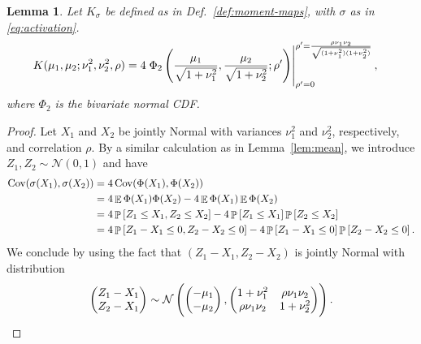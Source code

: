 \documentclass[oneside, article]{memoir}
\newtheorem{lemma}{Lemma}
\DeclareMathOperator{\expect}{\mathbb{E}}
\DeclareMathOperator{\probability}{\mathbb{P}}
\DeclareMathOperator{\Cov}{\operatorname{Cov}}
\begin{document}
\begin{lemma}
  Let \(K_\sigma\) be defined as in Def.~\ref{def:moment-maps}, with
  \(\sigma\) as in \eqref{eq:activation}.
  \begin{align*}
    K(\mu_1, \mu_2; \nu_1^2, \nu_2^2, \rho) &=
    4 \left.
    \Phi_2\del{
      \frac{\mu_1}{\sqrt{1 + \nu_1^2}},
      \frac{\mu_2}{\sqrt{1 + \nu_2^2}};
      \rho'
    }
    \right|^{\rho' = \frac{\rho \nu_1 \nu_2}{\sqrt{(1 +
    \nu_1^2)(1 + \nu_2^2)}}}_{\rho' = 0},
  \end{align*}
  where \(\Phi_2\) is the bivariate normal CDF.
\end{lemma}
\begin{proof}
  Let \(X_1\) and \(X_2\) be jointly Normal with variances
  \(\nu_1^2\) and \(\nu_2^2\), respectively, and correlation \(\rho\).
  By a similar calculation as in Lemma~\ref{lem:mean}, we introduce
  \(Z_1, Z_2 \sim \mathcal N(0, 1)\) and have
  \begin{align}
    \Cov (\sigma(X_1), \sigma(X_2))
    &= 4 \Cov (\Phi(X_1), \Phi(X_2))
    \\
    &= 4\expect \Phi(X_1) \Phi (X_2) - 4\expect \Phi(X_1) \expect \Phi(X_2)
    \\
    &= 4 \probability\sbr{Z_1 \leq X_1, Z_2 \leq X_2} -
    4\probability\sbr{Z_1 \leq X_1} \probability\sbr{Z_2 \leq X_2}
    \\
    &= 4 \probability\sbr{Z_1 - X_1 \leq 0, Z_2 - X_2 \leq 0} -
    4\probability\sbr{Z_1- X_1\leq 0} \probability\sbr{Z_2 - X_2 \leq 0}.
  \end{align}
  We conclude by using the fact that \((Z_1 - X_1, Z_2 - X_2)\) is
  jointly Normal with distribution
  \begin{align}
    \begin{pmatrix}
      Z_1 - X_1
      \\
      Z_2 - X_1
    \end{pmatrix}
    \sim
    \mathcal{N}\del{
      \begin{pmatrix}
        -\mu_1
        \\
        -\mu_2
      \end{pmatrix},
      \begin{pmatrix}
        1 + \nu_1^2
        &
        \rho \nu_1 \nu_2
        \\
        \rho \nu_1 \nu_2
        &
        1 + \nu_2^2
      \end{pmatrix}
    }.
  \end{align}
\end{proof}
\end{document}
